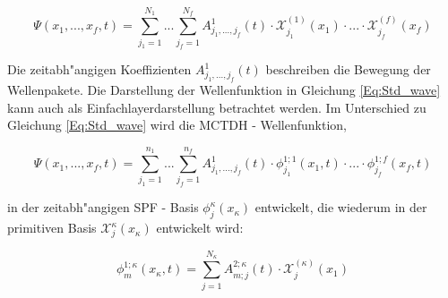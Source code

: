  \begin{equation}
 \Psi(x_{1},..., x_{f}, t)=\sum^{N_{1}}_{j_{1}=1} ... \sum^{N_{f}}_{j_{f}=1} A^{1}_{j_{1}, ..., j_{f}}(t)\cdot \mathcal{X}^{(1)}_{j_{1}}(x_{1}) \cdot ... \cdot \mathcal{X}^{(f)}_{j_{f}}(x_{f})
 \label{Eq:Std_wave}
 \end{equation}

Die zeitabh"angigen Koeffizienten $A^{1}_{j_{1}, ..., j_{f}}(t)$ beschreiben die Bewegung der Wellenpakete.
Die Darstellung der Wellenfunktion in Gleichung  \ref{Eq:Std_wave} kann auch als Einfachlayerdarstellung betrachtet werden.
Im Unterschied zu Gleichung \ref{Eq:Std_wave} wird die MCTDH - Wellenfunktion,

 \begin{equation}
 \Psi(x_{1},..., x_{f}, t)=\sum^{n_{1}}_{j_{1}=1} ... \sum^{n_{f}}_{j_{f}=1} A^{1}_{j_{1}, ..., j_{f}}(t)
 \cdot \phi^{1;1}_{j_{1}}(x_{1}, t) \cdot ... \cdot \phi^{1;f}_{j_{f}}(x_{f}, t)
 \label{Eq:mctdh_wave}
 \end{equation}

in der zeitabh"angigen SPF - Basis $\phi^{\kappa}_{j}(x_{\kappa})$ entwickelt, die wiederum in der primitiven Basis $\mathcal{X}^{\kappa}_{j}(x_{\kappa})$ entwickelt wird:

\begin{equation}
 \phi^{1;\kappa}_{m} (x_{\kappa}, t)=\sum^{N_{\kappa}}_{j=1} A^{2;\kappa}_{m;j}(t) \cdot \mathcal{X}^{(\kappa)}_{j}(x_{1})
 \label{Eq:SPF}
 \end{equation}


